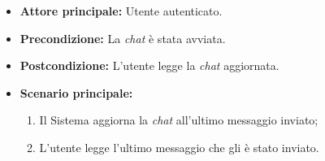 \label{usecase:Lettura chat}
\begin{itemize}
	\item \textbf{Attore principale:} Utente autenticato.

	\item \textbf{Precondizione:} La \textit{chat} è stata avviata.
	
	\item \textbf{Postcondizione:} L'utente legge la \textit{chat} aggiornata.

	\item \textbf{Scenario principale:}
            \begin{enumerate}
                \item Il Sistema aggiorna la \textit{chat} all'ultimo messaggio inviato;
                \item L'utente legge l'ultimo messaggio che gli è stato inviato.
	      \end{enumerate}
\end{itemize}